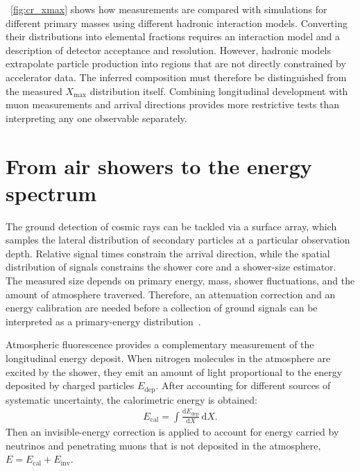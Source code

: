 \documentclass[main.tex]{subfiles}
\begin{document}
~\cref{fig:cr_xmax} shows how measurements are compared with simulations for different primary masses using different hadronic interaction models.
Converting their distributions into elemental fractions requires an interaction model and a description of detector acceptance and resolution.
However, hadronic models extrapolate particle production into regions that are not directly constrained by accelerator data.
The inferred composition must therefore be distinguished from the measured $X_{\max}$ distribution itself.
Combining longitudinal development with muon measurements and arrival directions provides more restrictive tests than interpreting any one observable separately.

\section{From air showers to the energy spectrum}
\label{sec:cr_detection}

The ground detection of cosmic rays can be tackled via a surface array, which samples the lateral distribution of secondary particles at a particular observation depth.
Relative signal times constrain the arrival direction, while the spatial distribution of signals constrains the shower core and a shower-size estimator.
The measured size depends on primary energy, mass, shower fluctuations, and the amount of atmosphere traversed.
Therefore, an attenuation correction and an energy calibration are needed before a collection of ground signals can be interpreted as a primary-energy distribution~\cite{Longair:2011:HighEnergyAstrohphysics}.

Atmospheric fluorescence provides a complementary measurement of the longitudinal energy deposit.
When nitrogen molecules in the atmosphere are excited by the shower, they emit an amount of light proportional to the energy deposited by charged particles $E_\mathrm{dep}$.
After accounting for different sources of systematic uncertainty, the calorimetric energy is obtained:
\begin{align}
    E_{\mathrm{cal}}=\int\frac{\mathrm{d}E_{\mathrm{dep}}}{\mathrm{d}X}\,\mathrm{d}X.
    \label{eq:cr_calorimetry}
\end{align}
Then an invisible-energy correction is applied to account for energy carried by neutrinos and penetrating muons that is not deposited in the atmosphere, $E=E_{\mathrm{cal}}+E_{\mathrm{inv}}$.
\end{document}
